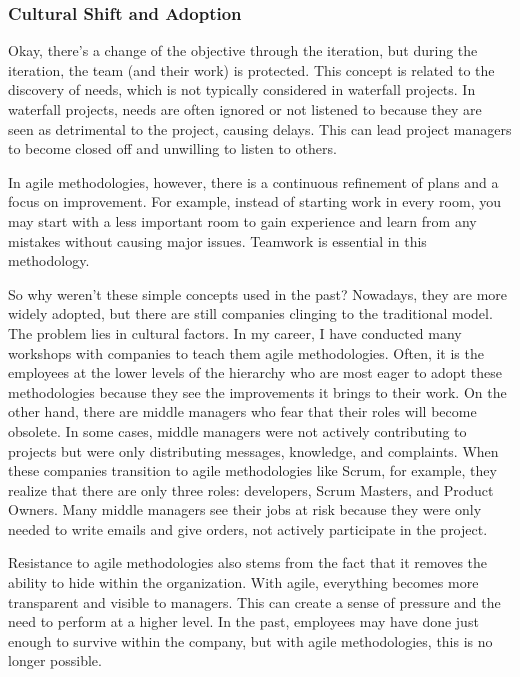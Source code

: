 \subsubsection{Cultural Shift and Adoption}

Okay, there's a change of the objective through the iteration, but during the iteration,
the team (and their work) is protected. This concept is related to the discovery of
needs, which is not typically considered in waterfall projects. In
waterfall projects, needs are often ignored or not listened to because
they are seen as detrimental to the project, causing delays. This can
lead project managers to become closed off and unwilling to listen to
others.

In agile methodologies, however, there is a continuous refinement of
plans and a focus on improvement. For example, instead of starting work
in every room, you may start with a less important room to gain
experience and learn from any mistakes without causing major issues.
Teamwork is essential in this methodology.

So why weren't these simple concepts used in the past? Nowadays, they
are more widely adopted, but there are still companies clinging to the
traditional model. The problem lies in cultural factors. In my career, I
have conducted many workshops with companies to teach them agile
methodologies. Often, it is the employees at the lower levels of the
hierarchy who are most eager to adopt these methodologies because they
see the improvements it brings to their work. On the other hand, there
are middle managers who fear that their roles will become obsolete. In
some cases, middle managers were not actively contributing to projects
but were only distributing messages, knowledge, and complaints. When
these companies transition to agile methodologies like Scrum, for
example, they realize that there are only three roles: developers, Scrum
Masters, and Product Owners. Many middle managers see their jobs at risk
because they were only needed to write emails and give orders, not
actively participate in the project.

Resistance to agile methodologies also stems from the fact that it
removes the ability to hide within the organization. With agile,
everything becomes more transparent and visible to managers. This can
create a sense of pressure and the need to perform at a higher level. In
the past, employees may have done just enough to survive within the
company, but with agile methodologies, this is no longer possible.

